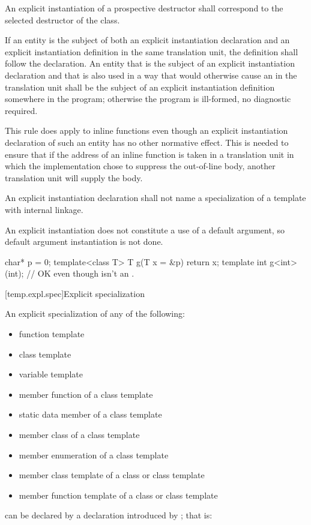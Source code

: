 \pnum
An explicit instantiation of a prospective destructor
shall correspond to the selected destructor of the class.

\pnum
If an entity is the subject of both an explicit instantiation declaration
and an explicit instantiation definition in the same translation unit, the
definition shall follow the declaration. An entity that is the subject of an
explicit instantiation declaration and that is also used
in a way that would otherwise cause an 
in the translation unit
shall be the subject of an explicit instantiation definition somewhere in the
program; otherwise the program is ill-formed, no diagnostic required.
\begin{note}
This rule does apply to inline functions even though an
explicit instantiation declaration of such an entity has no other normative
effect. This is needed to ensure that if the address of an inline function is
taken in a translation unit in which the implementation chose to suppress the
out-of-line body, another translation unit will supply the body.
\end{note}
An explicit instantiation declaration shall not name a specialization of a
template with internal linkage.

\pnum
An explicit instantiation does not constitute a use of a default argument,
so default argument instantiation is not done.
\begin{example}
\begin{codeblock}
char* p = 0;
template<class T> T g(T x = &p) { return x; }
template int g<int>(int);       // OK even though  isn't an .
\end{codeblock}
\end{example}

[temp.expl.spec]{Explicit specialization}

\pnum
{}%
An explicit specialization of any of the following:
\begin{itemize}
\item
function template
\item
class template
\item
variable template
\item
member function of a class template
\item
static data member of a class template
\item
member class of a class template
\item
member enumeration of a class template
\item
member class template of a class or class template
\item
member function template of a class or class template
\end{itemize}
can be declared by a declaration introduced by
;
that is:
%

